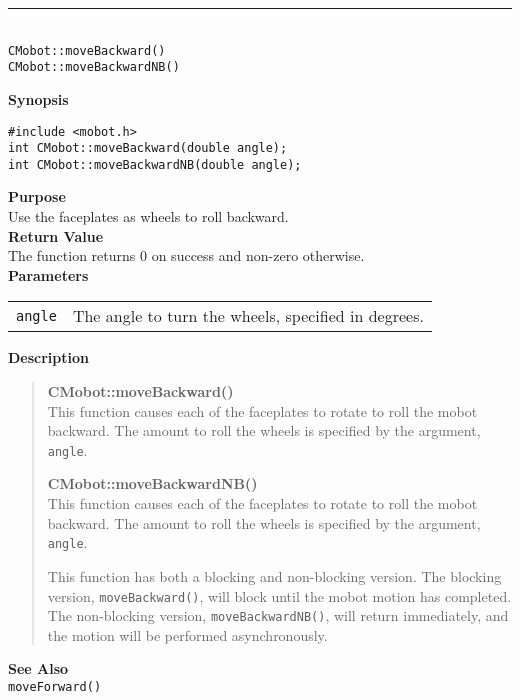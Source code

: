 \noindent
\vspace{5pt}
\rule{4.5in}{0.015in}\\
\noindent
{\LARGE \texttt{CMobot::moveBackward()}}\\
{\LARGE \texttt{CMobot::moveBackwardNB()}}\\
{}

\noindent
{\bf Synopsis}
\vspace{-8pt}
\begin{verbatim}
#include <mobot.h>
int CMobot::moveBackward(double angle);
int CMobot::moveBackwardNB(double angle);
\end{verbatim}

\noindent
{\bf Purpose}\\
Use the faceplates as wheels to roll backward.\\

\noindent
{\bf Return Value}\\
The function returns 0 on success and non-zero otherwise.\\

\noindent
{\bf Parameters}\\
\vspace{-0.1in}
\begin{description}
\item               
\begin{tabular}{p{15 mm}p{145 mm}}
\texttt{angle} & The angle to turn the wheels, specified in degrees.\\
\end{tabular}
\end{description}

\noindent
{\bf Description}\\
\vspace{-12pt}
\begin{quote}
{\bf CMobot::moveBackward()}\\
This function causes each of the faceplates to rotate to roll the
mobot backward. The amount to roll the wheels is specified by the argument,
\texttt{angle}.

{\bf CMobot::moveBackwardNB()}\\
This function causes each of the faceplates to rotate to roll the
mobot backward. The amount to roll the wheels is specified by the argument,
\texttt{angle}.

This function has both a blocking and non-blocking version.
The blocking version, \texttt{moveBackward()}, will block until the
mobot motion has completed. The non-blocking version, \texttt{moveBackwardNB()},
will return immediately, and the motion will be performed asynchronously.\\
\end{quote}

\noindent
{\bf See Also}\\
\texttt{moveForward()}

